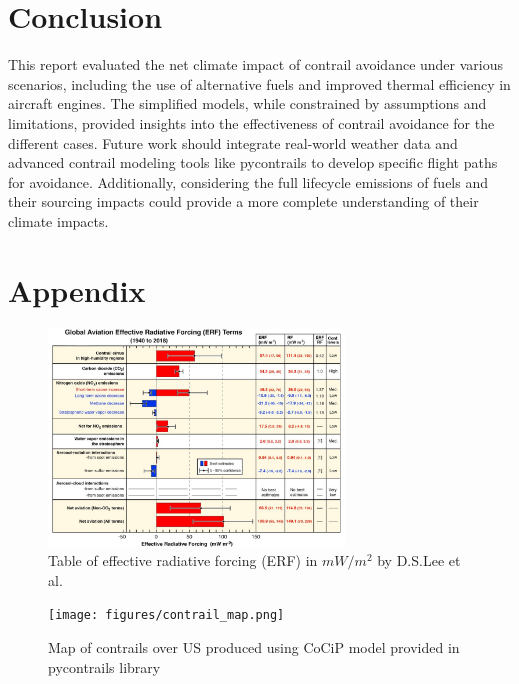 \documentclass{article}
\begin{document}
\section{Conclusion}

This report evaluated the net climate impact of contrail avoidance under various scenarios, including the use of alternative fuels and improved thermal efficiency in aircraft engines.
The simplified models, while constrained by assumptions and limitations, provided insights into the effectiveness of contrail avoidance for the different cases.
Future work should integrate real-world weather data and advanced contrail modeling tools like pycontrails to develop specific flight paths for avoidance.
Additionally, considering the full lifecycle emissions of fuels and their sourcing impacts could provide a more complete understanding of their climate impacts.

\section{Appendix}

\begin{figure}[H]
    \centering
    \includegraphics[width=0.7\textwidth]{figures/DSLee_ERFtable.jpg}
    \caption{Table of effective radiative forcing (ERF) in $mW/m^2$ by D.S.Lee et al. \cite{contrail_radiative_forcing}}
    \label{fig:rf_table}
\end{figure}

\begin{figure}[H]
    \centering
    \texttt{[image: figures/contrail\_map.png]}
    \caption{Map of contrails over US produced using CoCiP model provided in pycontrails library \cite{pycontrails}}
    \label{fig:contrail_map}
\end{figure}
\end{document}
